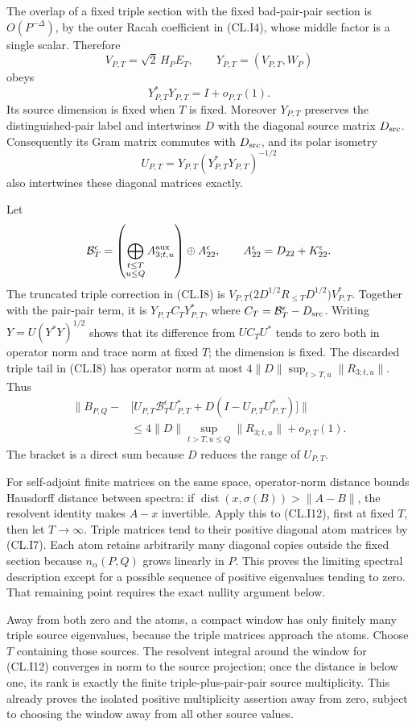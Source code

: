 The overlap of a fixed triple section with the fixed bad-pair-pair section is \(O(P^{-\Delta})\), by the outer Racah coefficient in (CL.I4), whose middle factor is a single scalar. Therefore \[
V_{P,T}=\sqrt2\,H_PE_T,\qquad
Y_{P,T}=(V_{P,T},W_P)
\] obeys \[
Y_{P,T}^*Y_{P,T}=I+o_{P,T}(1).
\tag{CL.I10}
\] Its source dimension is fixed when \(T\) is fixed. Moreover \(Y_{P,T}\) preserves the distinguished-pair label and intertwines \(D\) with the diagonal source matrix \(D_{\rm src}\). Consequently its Gram matrix commutes with \(D_{\rm src}\), and its polar isometry \[
U_{P,T}=Y_{P,T}(Y_{P,T}^*Y_{P,T})^{-1/2}
\tag{CL.I11}
\] also intertwines these diagonal matrices exactly.

Let \[
\mathcal B_T^\epsilon=
\left(\bigoplus_{\substack{t\leq T\\u\leq Q}}A_{3;t,u}^{\rm aux}\right)
\oplus A_{22}^{\epsilon},
\qquad
A_{22}^{\epsilon}=D_{22}+K_{22}^{\epsilon}.
\] The truncated triple correction in (CL.I8) is \(V_{P,T}\bigl(2D^{1/2}R_{\leq T}D^{1/2}\bigr)V_{P,T}^*\). Together with the pair-pair term, it is \(Y_{P,T}C_TY_{P,T}^*\), where \(C_T=\mathcal B_T^\epsilon-D_{\rm src}\). Writing \(Y=U(Y^*Y)^{1/2}\) shows that its difference from \(U C_TU^*\) tends to zero both in operator norm and trace norm at fixed \(T\); the dimension is fixed. The discarded triple tail in (CL.I8) has operator norm at most \(4\|D\|\sup_{t>T,u}\|R_{3;t,u}\|\). Thus \[
\begin{split}
\bigl\|B_{P,Q}
-&\bigl[U_{P,T}\mathcal B_T^\epsilon U_{P,T}^*
+D(I-U_{P,T}U_{P,T}^*)\bigr]\bigr\|\\
&\leq4\|D\|\sup_{t>T,u\leq Q}\|R_{3;t,u}\|
+o_{P,T}(1).
\end{split}
\tag{CL.I12}
\] The bracket is a direct sum because \(D\) reduces the range of \(U_{P,T}\).

For self-adjoint finite matrices on the same space, operator-norm distance bounds Hausdorff distance between spectra: if \(\operatorname{dist}(x,\sigma(B))>\|A-B\|\), the resolvent identity makes \(A-x\) invertible. Apply this to (CL.I12), first at fixed \(T\), then let \(T\to\infty\). Triple matrices tend to their positive diagonal atom matrices by (CL.I7). Each atom retains arbitrarily many diagonal copies outside the fixed section because \(n_\alpha(P,Q)\) grows linearly in \(P\). This proves the limiting spectral description except for a possible sequence of positive eigenvalues tending to zero. That remaining point requires the exact nullity argument below.

Away from both zero and the atoms, a compact window has only finitely many triple source eigenvalues, because the triple matrices approach the atoms. Choose \(T\) containing those sources. The resolvent integral around the window for (CL.I12) converges in norm to the source projection; once the distance is below one, its rank is exactly the finite triple-plus-pair-pair source multiplicity. This already proves the isolated positive multiplicity assertion away from zero, subject to choosing the window away from all other source values.

